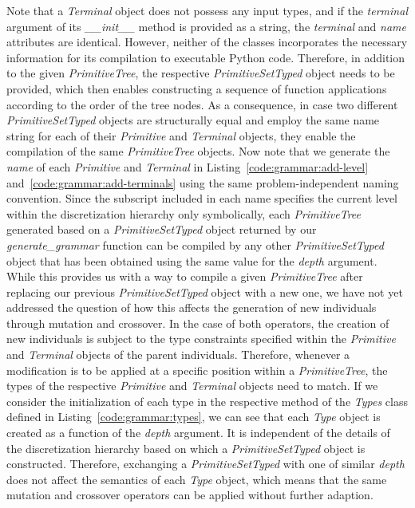 Note that a \emph{Terminal} object does not possess any input types, and if the \emph{terminal} argument of its \emph{\_\_init\_\_} method is provided as a string, the \emph{terminal} and \emph{name} attributes are identical.
However, neither of the classes incorporates the necessary information for its compilation to executable Python code.
Therefore, in addition to the given \emph{PrimitiveTree}, the respective \emph{PrimitiveSetTyped} object needs to be provided, which then enables constructing a sequence of function applications according to the order of the tree nodes.  
As a consequence, in case two different \emph{PrimitiveSetTyped} objects are structurally equal and employ the same name string for each of their \emph{Primitive} and \emph{Terminal} objects, they enable the compilation of the same \emph{PrimitiveTree} objects.
Now note that we generate the \emph{name} of each \emph{Primitive} and \emph{Terminal} in Listing~\ref{code:grammar:add-level} and~\ref{code:grammar:add-terminals} using the same problem-independent naming convention.
Since the subscript included in each name specifies the current level within the discretization hierarchy only symbolically, each \emph{PrimitiveTree} generated based on a \emph{PrimitiveSetTyped} object returned by our \emph{generate\_grammar} function can be compiled by any other \emph{PrimitiveSetTyped} object that has been obtained using the same value for the \emph{depth} argument.
While this provides us with a way to compile a given \emph{PrimitiveTree} after replacing our previous \emph{PrimitiveSetTyped} object with a new one, we have not yet addressed the question of how this affects the generation of new individuals through mutation and crossover.
In the case of both operators, the creation of new individuals is subject to the type constraints specified within the \emph{Primitive} and \emph{Terminal} objects of the parent individuals.
Therefore, whenever a modification is to be applied at a specific position within a \emph{PrimitiveTree}, the types of the respective \emph{Primitive} and \emph{Terminal} objects need to match.
If we consider the initialization of each type in the respective method of the \emph{Types} class defined in Listing~\ref{code:grammar:types}, we can see that each \emph{Type} object is created as a function of the \emph{depth} argument.
It is independent of the details of the discretization hierarchy based on which a \emph{PrimitiveSetTyped} object is constructed.
Therefore, exchanging a \emph{PrimitiveSetTyped} with one of similar \emph{depth} does not affect the semantics of each \emph{Type} object, which means that the same mutation and crossover operators can be applied without further adaption.
